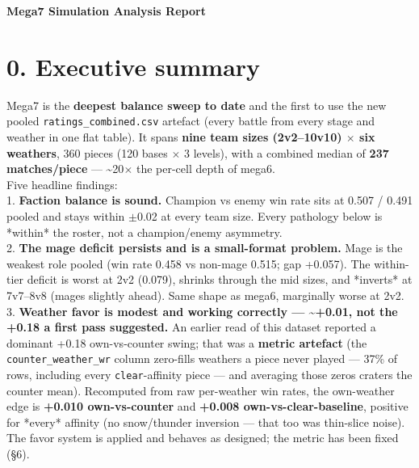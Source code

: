 \documentclass[10pt]{article}
\begin{document}
\begin{center}{\LARGE\bfseries Mega7 Simulation Analysis Report}\end{center}\vspace{6pt}

\section*{0. Executive summary}

Mega7 is the \textbf{deepest balance sweep to date} and the first to use the new pooled \texttt{ratings\_\allowbreak{}combined.\allowbreak{}csv} artefact (every battle from every stage and weather in one flat table). It spans \textbf{nine team sizes (2v2--10v10) $\times$ six weathers}, 360 pieces (120 bases $\times$ 3 levels), with a combined median of \textbf{237 matches/piece} --- \textasciitilde{}20$\times$ the per-cell depth of mega6.\\

Five headline findings:\\

1. \textbf{Faction balance is sound.} Champion vs enemy win rate sits at 0.507 / 0.491 pooled and stays within $\pm$0.02 at every team size. Every pathology below is *within* the roster, not a champion/enemy asymmetry.\\

2. \textbf{The mage deficit persists and is a small-format problem.} Mage is the weakest role pooled (win rate 0.458 vs non-mage 0.515; gap +0.057). The within-tier deficit is worst at 2v2 (0.079), shrinks through the mid sizes, and *inverts* at 7v7--8v8 (mages slightly ahead). Same shape as mega6, marginally worse at 2v2.\\

3. \textbf{Weather favor is modest and working correctly --- \textasciitilde{}+0.01, not the +0.18 a first pass suggested.} An earlier read of this dataset reported a dominant +0.18 own-vs-counter swing; that was a \textbf{metric artefact} (the \texttt{counter\_\allowbreak{}weather\_\allowbreak{}wr} column zero-fills weathers a piece never played --- 37\% of rows, including every \texttt{clear}-affinity piece --- and averaging those zeros craters the counter mean). Recomputed from raw per-weather win rates, the own-weather edge is \textbf{+0.010 own-vs-counter} and \textbf{+0.008 own-vs-clear-baseline}, positive for *every* affinity (no snow/thunder inversion --- that too was thin-slice noise). The favor system is applied and behaves as designed; the metric has been fixed (\S{}6).\\
\end{document}
